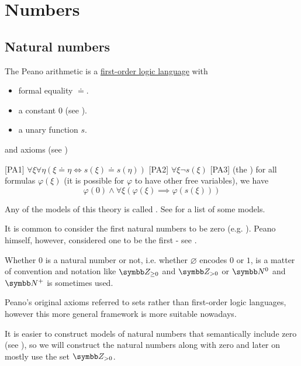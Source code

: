 \section{Numbers}\label{sec:numbers}
\subsection{Natural numbers}\label{subsec:natural_numbers}

\begin{definition}\label{def:peano_arithmetic}\cite[1]{Peano1889}
  The Peano arithmetic is a \hyperref[def:first_order_logic_language]{first-order logic language} with 
  \begin{itemize}
    \item formal equality \( \doteq \).
    \item a constant \( 0 \) (see ).
    \item a unary function \( s \).
  \end{itemize}
  and axioms (see )
  \begin{defenum}
    [PA1] \( \forall \xi \forall \eta (\xi \doteq \eta \iff s(\xi) \doteq s(\eta)) \)
    [PA2] \( \forall \xi \neg s(\xi) \)
    [PA3] (the ) for all formulas \( \varphi(\xi) \) (it is possible for \( \varphi \) to have other free variables), we have
    \begin{equation*}
      \varphi(0) \land \forall \xi (\varphi(\xi) \implies \varphi(s(\xi)))
    \end{equation*}
  \end{defenum}

  Any of the models of this theory is called . See  for a list of some models.
\end{definition}

\begin{remark}\label{remark:peano_arithmetic_zero}
  It is common to consider the first natural numbers to be zero (e.g. \cite[67]{Enderton1977}). Peano himself, however, considered one to be the first - see \cite[1]{Peano1889}.

  Whether \( 0 \) is a natural number or not, i.e. whether \( \varnothing \) encodes \( 0 \) or \( 1 \), is a matter of convention and notation like \( \BZ_{\geq 0} \) and \( \BZ_{>0} \) or \( \BN^0 \) and \( \BN^+ \) is sometimes used.

  Peano's original axioms referred to sets rather than first-order logic languages, however this more general framework is more suitable nowadays.

  It is easier to construct models of natural numbers that semantically include zero (see ), so we will construct the natural numbers along with zero and later on mostly use the set \( \BZ_{>0} \).
\end{remark}

